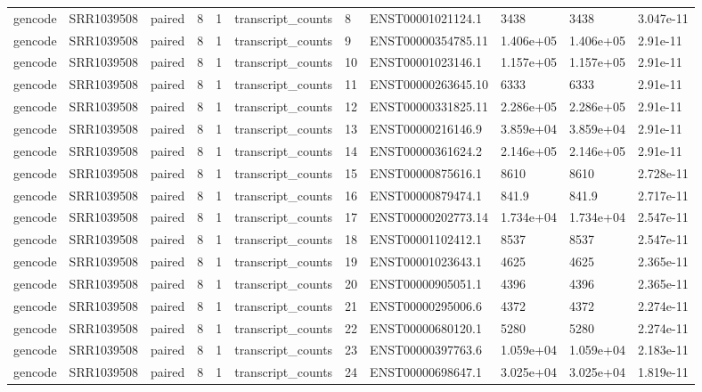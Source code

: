 \begin{tabular}{lllllllllll}
gencode & SRR1039508 & paired & 8 & 1 & transcript\_counts & 8 & ENST00001021124.1 & 3438 & 3438 & 3.047e-11 \\
gencode & SRR1039508 & paired & 8 & 1 & transcript\_counts & 9 & ENST00000354785.11 & 1.406e+05 & 1.406e+05 & 2.91e-11 \\
gencode & SRR1039508 & paired & 8 & 1 & transcript\_counts & 10 & ENST00001023146.1 & 1.157e+05 & 1.157e+05 & 2.91e-11 \\
gencode & SRR1039508 & paired & 8 & 1 & transcript\_counts & 11 & ENST00000263645.10 & 6333 & 6333 & 2.91e-11 \\
gencode & SRR1039508 & paired & 8 & 1 & transcript\_counts & 12 & ENST00000331825.11 & 2.286e+05 & 2.286e+05 & 2.91e-11 \\
gencode & SRR1039508 & paired & 8 & 1 & transcript\_counts & 13 & ENST00000216146.9 & 3.859e+04 & 3.859e+04 & 2.91e-11 \\
gencode & SRR1039508 & paired & 8 & 1 & transcript\_counts & 14 & ENST00000361624.2 & 2.146e+05 & 2.146e+05 & 2.91e-11 \\
gencode & SRR1039508 & paired & 8 & 1 & transcript\_counts & 15 & ENST00000875616.1 & 8610 & 8610 & 2.728e-11 \\
gencode & SRR1039508 & paired & 8 & 1 & transcript\_counts & 16 & ENST00000879474.1 & 841.9 & 841.9 & 2.717e-11 \\
gencode & SRR1039508 & paired & 8 & 1 & transcript\_counts & 17 & ENST00000202773.14 & 1.734e+04 & 1.734e+04 & 2.547e-11 \\
gencode & SRR1039508 & paired & 8 & 1 & transcript\_counts & 18 & ENST00001102412.1 & 8537 & 8537 & 2.547e-11 \\
gencode & SRR1039508 & paired & 8 & 1 & transcript\_counts & 19 & ENST00001023643.1 & 4625 & 4625 & 2.365e-11 \\
gencode & SRR1039508 & paired & 8 & 1 & transcript\_counts & 20 & ENST00000905051.1 & 4396 & 4396 & 2.365e-11 \\
gencode & SRR1039508 & paired & 8 & 1 & transcript\_counts & 21 & ENST00000295006.6 & 4372 & 4372 & 2.274e-11 \\
gencode & SRR1039508 & paired & 8 & 1 & transcript\_counts & 22 & ENST00000680120.1 & 5280 & 5280 & 2.274e-11 \\
gencode & SRR1039508 & paired & 8 & 1 & transcript\_counts & 23 & ENST00000397763.6 & 1.059e+04 & 1.059e+04 & 2.183e-11 \\
gencode & SRR1039508 & paired & 8 & 1 & transcript\_counts & 24 & ENST00000698647.1 & 3.025e+04 & 3.025e+04 & 1.819e-11 \\

\end{tabular}
